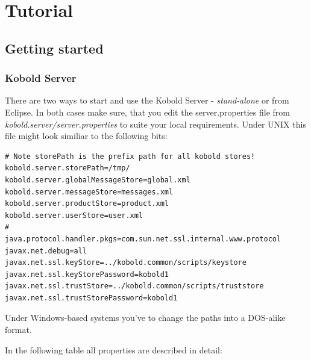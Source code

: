 \chapter{Tutorial}

\section{Getting started}

\subsection{Kobold Server}
There are two ways to start and use the Kobold Server - {\it stand-alone} or from
{Eclipse}. In both cases make sure, that you edit the server.properties
file from {\it kobold.server/server.properties} to suite your local
requirements. Under UNIX this file might look similiar to the following
bits:

\begin{verbatim}
# Note storePath is the prefix path for all kobold stores!
kobold.server.storePath=/tmp/
kobold.server.globalMessageStore=global.xml
kobold.server.messageStore=messages.xml
kobold.server.productStore=product.xml
kobold.server.userStore=user.xml
#
java.protocol.handler.pkgs=com.sun.net.ssl.internal.www.protocol
javax.net.debug=all
javax.net.ssl.keyStore=../kobold.common/scripts/keystore
javax.net.ssl.keyStorePassword=kobold1
javax.net.ssl.trustStore=../kobold.common/scripts/truststore
javax.net.ssl.trustStorePassword=kobold1
\end{verbatim}

Under Windows-based systems you've to change the paths into a
DOS-alike format.

In the following table all properties are described in detail:

